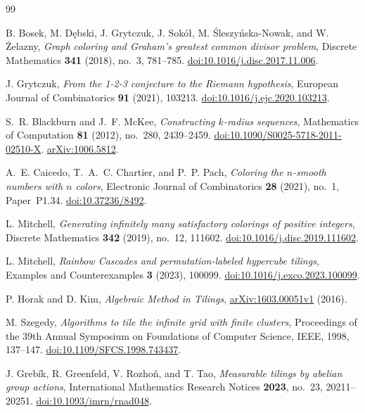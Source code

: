 \documentclass[11pt,reqno]{amsart}
\theoremstyle{definition}
\theoremstyle{remark}
\numberwithin{equation}{section}
\begin{document}
\FloatBarrier
\clearpage
\begin{thebibliography}{99}

B. Bosek, M. D\k{e}bski, J. Grytczuk, J. Sok\'o\l{},
M. \'Sleszy\'nska-Nowak, and W. \.Zelazny,
\emph{Graph coloring and Graham's greatest common divisor problem},
Discrete Mathematics \textbf{341} (2018), no.~3, 781--785.
\href{https://doi.org/10.1016/j.disc.2017.11.006}{doi:10.1016/j.disc.2017.11.006}.

J. Grytczuk,
\emph{From the 1-2-3 conjecture to the Riemann hypothesis},
European Journal of Combinatorics \textbf{91} (2021), 103213.
\href{https://doi.org/10.1016/j.ejc.2020.103213}{doi:10.1016/j.ejc.2020.103213}.

S.~R. Blackburn and J.~F. McKee,
\emph{Constructing $k$-radius sequences},
Mathematics of Computation \textbf{81} (2012), no.~280, 2439--2459.
\href{https://doi.org/10.1090/S0025-5718-2011-02510-X}{doi:10.1090/S0025-5718-2011-02510-X}.
\href{https://arxiv.org/abs/1006.5812}{arXiv:1006.5812}.

A.~E. Caicedo, T.~A.~C. Chartier, and P.~P. Pach,
\emph{Coloring the $n$-smooth numbers with $n$ colors},
Electronic Journal of Combinatorics \textbf{28} (2021), no.~1, Paper~P1.34.
\href{https://doi.org/10.37236/8492}{doi:10.37236/8492}.

L. Mitchell,
\emph{Generating infinitely many satisfactory colorings of positive integers},
Discrete Mathematics \textbf{342} (2019), no.~12, 111602.
\href{https://doi.org/10.1016/j.disc.2019.111602}{doi:10.1016/j.disc.2019.111602}.

L. Mitchell,
\emph{Rainbow Cascades and permutation-labeled hypercube tilings},
Examples and Counterexamples \textbf{3} (2023), 100099.
\href{https://doi.org/10.1016/j.exco.2023.100099}{doi:10.1016/j.exco.2023.100099}.

P. Horak and D. Kim,
\emph{Algebraic Method in Tilings},
\href{https://arxiv.org/abs/1603.00051v1}{arXiv:1603.00051v1} (2016).

M. Szegedy,
\emph{Algorithms to tile the infinite grid with finite clusters},
Proceedings of the 39th Annual Symposium on Foundations of Computer Science,
IEEE, 1998, 137--147.
\href{https://doi.org/10.1109/SFCS.1998.743437}{doi:10.1109/SFCS.1998.743437}.

J. Greb\'ik, R. Greenfeld, V. Rozho\v{n}, and T. Tao,
\emph{Measurable tilings by abelian group actions},
International Mathematics Research Notices \textbf{2023}, no.~23, 20211--20251.
\href{https://doi.org/10.1093/imrn/rnad048}{doi:10.1093/imrn/rnad048}.


\end{thebibliography}
\end{document}

